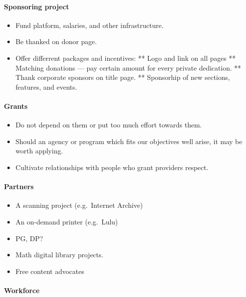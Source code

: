 \begin{itemize}
\paragraph{Sponsoring project}

\begin{itemize}
\item
  Fund platform, salaries, and other infrastructure.
\item
  Be thanked on donor page.
\item
  Offer differrent packages and incentives: ** Logo and link on all
  pages ** Matching donations --- pay certain amount for every private
  dedication. ** Thank corporate sponsors on title page. ** Sponsorhip
  of new sections, features, and events.
\end{itemize}

\paragraph{Grants}

\begin{itemize}
\item
  Do not depend on them or put too much effort towards them.
\item
  Should an agency or program which fits our objectives well arise, it
  may be worth applying.
\item
  Cultivate relationships with people who grant providers respect.
\end{itemize}

\paragraph{Partners}

\begin{itemize}
\item
  A scanning project (e.g.~Internet Archive)
\item
  An on-demand printer (e.g.~Lulu)
\item
  PG, DP?
\item
  Math digital library projects.
\item
  Free content advocates
\end{itemize}

\paragraph{Workforce}


\end{itemize}
